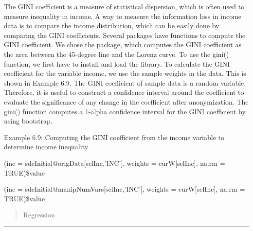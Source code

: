 \documentclass[letterpaper,10pt,english]{sphinxmanual}
\begin{document}
The GINI coefficient is a measure of statistical dispersion, which is
often used to measure inequality in income. A way to measure the
information loss in income data is to compare the income distribution,
which can be easily done by comparing the GINI coefficients. Several 
packages have functions to compute the GINI coefficient. We chose the
 package, which computes the GINI coefficient as the area
between the 45-degree line and the Lorenz curve. To use the gini()
function, we first have to install and load the  library. To
calculate the GINI coefficient for the variable income, we use the
sample weights in the data. This is shown in Example 6.9. The GINI
coefficient of sample data is a random variable. Therefore, it is useful
to construct a confidence interval around the coefficient to evaluate
the significance of any change in the coefficient after anonymization.
The gini() function computes a 1-alpha confidence interval for the GINI
coefficient by using bootstrap.

Example 6.9: Computing the GINI coefficient from the income variable to
determine income inequality

\begin{DUlineblock}{0em}
\item[] 
\item[] (inc = sdcInitial@origData{[}selInc,’INC’{]}, weights =
curW{[}selInc{]}, na.rm = TRUE)\$value 
\end{DUlineblock}


\begin{DUlineblock}{0em}
\item[] 
\item[] (inc = sdcInitial@manipNumVars{[}selInc,’INC’{]}, weights =
curW{[}selInc{]}, na.rm = TRUE)\$value 
\end{DUlineblock}

\begin{quote}

Regression
\end{quote}


\bigskip\hrule\bigskip
\end{document}
